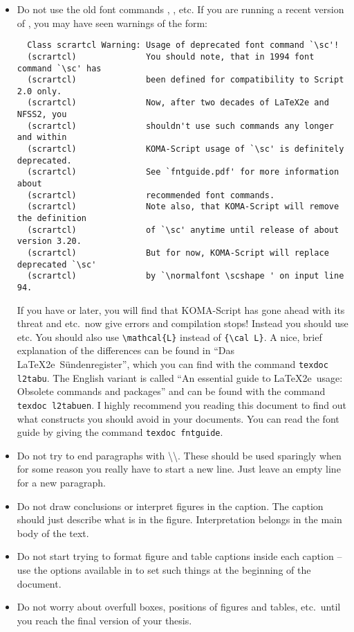 \begin{itemize}
\item Do not use the old font commands , ,  etc.
  If you are running a recent version of \TeXLive, you may have seen warnings of the form:
  \begin{verbatim}
  Class scrartcl Warning: Usage of deprecated font command `\sc'!
  (scrartcl)              You should note, that in 1994 font command `\sc' has
  (scrartcl)              been defined for compatibility to Script 2.0 only.
  (scrartcl)              Now, after two decades of LaTeX2e and NFSS2, you
  (scrartcl)              shouldn't use such commands any longer and within
  (scrartcl)              KOMA-Script usage of `\sc' is definitely deprecated.
  (scrartcl)              See `fntguide.pdf' for more information about
  (scrartcl)              recommended font commands.
  (scrartcl)              Note also, that KOMA-Script will remove the definition
  (scrartcl)              of `\sc' anytime until release of about version 3.20.
  (scrartcl)              But for now, KOMA-Script will replace deprecated `\sc'
  (scrartcl)              by `\normalfont \scshape ' on input line 94.
  \end{verbatim}
  If you have  or later, you will find that KOMA-Script has gone ahead with its threat 
  and  etc.\ now give errors and compilation stops!
  Instead you should use  etc.
  You should also use \verb|\mathcal{L}| instead of \verb|{\cal L}|.
  A nice, brief explanation of the differences can be found in \foreignlanguage{ngerman}{\enquote{Das \LaTeX2e\ Sündenregister}},
  which you can find with the command \texttt{texdoc l2tabu}.
  The English variant is called \enquote{An essential guide to \LaTeX2e\ usage: Obsolete commands and packages}
  and can be found with the command \texttt{texdoc l2tabuen}.
  I highly recommend you reading this document to find out what constructs you should avoid in your documents.
  You can read the font guide by giving the command \texttt{texdoc fntguide}.
  
\item Do not try to end paragraphs with
  \textbackslash\textbackslash. These should be used sparingly when
  for some reason you really have to start a new line. Just leave an
  empty line for a new paragraph.
  
\item Do not draw conclusions or interpret figures in the caption. The
  caption should just describe what is in the figure. Interpretation
  belongs in the main body of the text.
  
\item Do not start trying to format figure and table captions inside
  each caption -- use the options available in \KOMAScript{} to set
  such things at the beginning of the document.
  
\item Do not worry about overfull boxes, positions of figures
  and tables, etc.\ until you reach the final version of your thesis.
\end{itemize}


